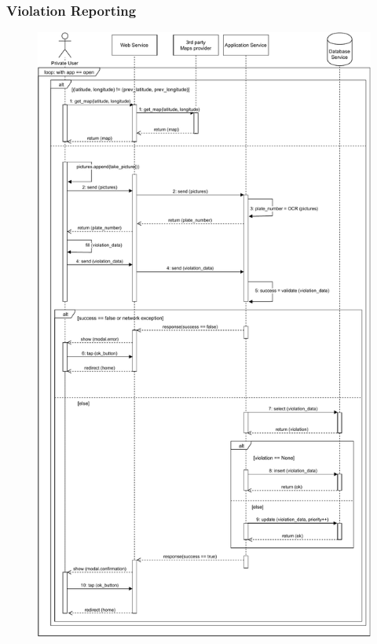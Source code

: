 \documentclass[12pt,a4paper]{article}
\begin{document}
\subsubsection{Violation Reporting}
\begin{figure}[H]
				\centering
				\includegraphics[width=1\textwidth,height=0.9\textheight,keepaspectratio]{../assets/sequence_diagrams/exports/workflow_private_subject.pdf}
				\label{fig:workflow1_sequence}
			\end{figure}
\end{document}
